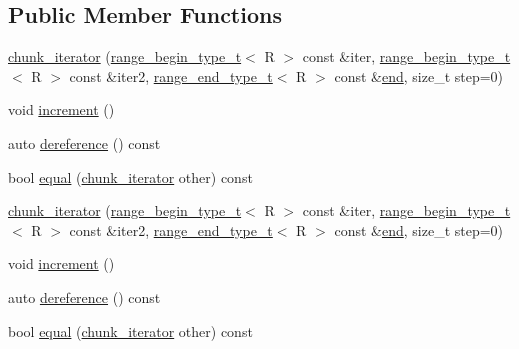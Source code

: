 \subsection*{Public Member Functions}
\begin{DoxyCompactItemize}
\item 
\mbox{\hyperlink{structrah_1_1view_1_1chunk__iterator_a2675282334475c594c96fdcc6c646895}{chunk\+\_\+iterator}} (\mbox{\hyperlink{namespacerah_a28aff4eeddcece6be65ff0b956d32d4a}{range\+\_\+begin\+\_\+type\+\_\+t}}$<$ R $>$ const \&iter, \mbox{\hyperlink{namespacerah_a28aff4eeddcece6be65ff0b956d32d4a}{range\+\_\+begin\+\_\+type\+\_\+t}}$<$ R $>$ const \&iter2, \mbox{\hyperlink{namespacerah_a9657e24ae477f4482225b133fe286b65}{range\+\_\+end\+\_\+type\+\_\+t}}$<$ R $>$ const \&\mbox{\hyperlink{namespacerah_aaddd1442cd76b96876e692cdefe7261d}{end}}, size\+\_\+t step=0)
\item 
void \mbox{\hyperlink{structrah_1_1view_1_1chunk__iterator_a5159787ea568a933e219a9218daf3e61}{increment}} ()
\item 
auto \mbox{\hyperlink{structrah_1_1view_1_1chunk__iterator_ad552c568bb914a6107bdcb19a5b9aa88}{dereference}} () const
\item 
bool \mbox{\hyperlink{structrah_1_1view_1_1chunk__iterator_a30a848e24020b169cf18626b2034adaf}{equal}} (\mbox{\hyperlink{structrah_1_1view_1_1chunk__iterator}{chunk\+\_\+iterator}} other) const
\item 
\mbox{\hyperlink{structrah_1_1view_1_1chunk__iterator_a2675282334475c594c96fdcc6c646895}{chunk\+\_\+iterator}} (\mbox{\hyperlink{namespacerah_a28aff4eeddcece6be65ff0b956d32d4a}{range\+\_\+begin\+\_\+type\+\_\+t}}$<$ R $>$ const \&iter, \mbox{\hyperlink{namespacerah_a28aff4eeddcece6be65ff0b956d32d4a}{range\+\_\+begin\+\_\+type\+\_\+t}}$<$ R $>$ const \&iter2, \mbox{\hyperlink{namespacerah_a9657e24ae477f4482225b133fe286b65}{range\+\_\+end\+\_\+type\+\_\+t}}$<$ R $>$ const \&\mbox{\hyperlink{namespacerah_aaddd1442cd76b96876e692cdefe7261d}{end}}, size\+\_\+t step=0)
\item 
void \mbox{\hyperlink{structrah_1_1view_1_1chunk__iterator_a5159787ea568a933e219a9218daf3e61}{increment}} ()
\item 
auto \mbox{\hyperlink{structrah_1_1view_1_1chunk__iterator_ad552c568bb914a6107bdcb19a5b9aa88}{dereference}} () const
\item 
bool \mbox{\hyperlink{structrah_1_1view_1_1chunk__iterator_a30a848e24020b169cf18626b2034adaf}{equal}} (\mbox{\hyperlink{structrah_1_1view_1_1chunk__iterator}{chunk\+\_\+iterator}} other) const
\end{DoxyCompactItemize}
